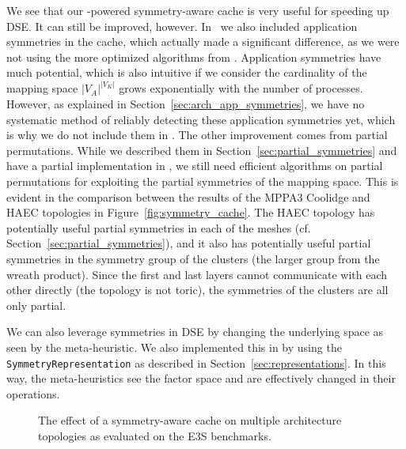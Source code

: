 We see that our \mpsym-powered symmetry-aware cache is very useful for speeding up \ac{DSE}.
It can still be improved, however.
In~\cite{goens_taco17} we also included application symmetries in the cache, which actually made a significant difference, as we were not using the more optimized algorithms from \mpsym.
Application symmetries have much potential, which is also intuitive if we consider the cardinality of the mapping space $|V_A|^{|V_K|}$ grows exponentially with the number of processes.
However, as explained in Section~\ref{sec:arch_app_symmetries}, we have no systematic method of reliably detecting these application symmetries yet, which is why we do not include them in \mocasin.
The other improvement comes from partial permutations. While we described them in Section~\ref{sec:partial_symmetries} and have a partial implementation in \mpsym, we still need efficient algorithms on partial permutations for exploiting the partial symmetries of the mapping space.
This is evident in the comparison between the results of the MPPA3 Coolidge and \ac{HAEC} topologies in Figure~\ref{fig:symmetry_cache}.
The \ac{HAEC} topology has potentially useful partial symmetries in each of the meshes (cf. Section~\ref{sec:partial_symmetries}), and it also has potentially useful partial symmetries in the symmetry group of the clusters (the larger group from the wreath product).
Since the first and last layers cannot communicate with each other directly (the topology is not toric), the symmetries of the clusters are all only partial.

We can also leverage symmetries in \ac{DSE} by changing the underlying space as seen by the meta-heuristic.
We also implemented this in \mocasin by using the \texttt{SymmetryRepresentation} as described in Section~\ref{sec:representations}.
In this way, the meta-heuristics see the factor space and are effectively changed in their operations.

\begin{figure}[h]
	\centering
   \resizebox{0.95\textwidth}{!}{}
	\caption{The effect of a symmetry-aware cache on multiple architecture topologies as evaluated on the \ac{E3S} benchmarks.}
	\label{fig:symmetry_changed_operations}
\end{figure}

